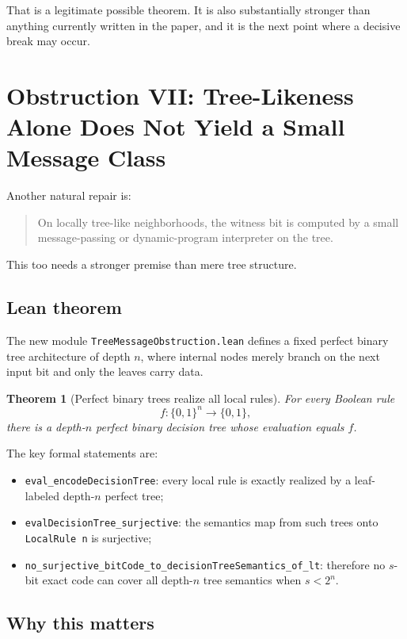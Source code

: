 \documentclass[11pt]{article}
\newtheorem{theorem}{Theorem}[section]
\theoremstyle{remark}
\begin{document}
That is a legitimate possible theorem.  It is also substantially stronger than anything currently
written in the paper, and it is the next point where a decisive break may occur.

\section{Obstruction VII: Tree-Likeness Alone Does Not Yield a Small Message Class}

Another natural repair is:
\begin{quote}
On locally tree-like neighborhoods, the witness bit is computed by a small message-passing or
dynamic-program interpreter on the tree.
\end{quote}

This too needs a stronger premise than mere tree structure.

\subsection{Lean theorem}

The new module \texttt{TreeMessageObstruction.lean} defines a fixed perfect binary tree
architecture of depth \(n\), where internal nodes merely branch on the next input bit and only the
leaves carry data.

\begin{theorem}[Perfect binary trees realize all local rules]
For every Boolean rule
\[
  f : \{0,1\}^n \to \{0,1\},
\]
there is a depth-\(n\) perfect binary decision tree whose evaluation equals \(f\).
\end{theorem}

\noindent
The key formal statements are:
\begin{itemize}[leftmargin=1.5em]
  \item \texttt{eval\_encodeDecisionTree}: every local rule is exactly realized by a leaf-labeled
  depth-\(n\) perfect tree;
  \item \texttt{evalDecisionTree\_surjective}: the semantics map from such trees onto
  \texttt{LocalRule n} is surjective;
  \item \texttt{no\_surjective\_bitCode\_to\_decisionTreeSemantics\_of\_lt}: therefore no
  \(s\)-bit exact code can cover all depth-\(n\) tree semantics when \(s < 2^n\).
\end{itemize}

\subsection{Why this matters}
\end{document}

